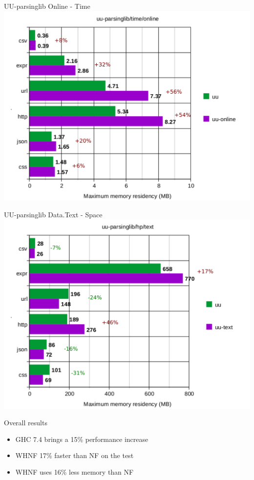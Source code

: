 \documentclass{beamer}
\begin{document}
\begin{frame}{UU-parsinglib Online - Time}
\includegraphics[scale=0.5]{presentation/uu-parsinglib-time-online_.pdf}
\end{frame}

\begin{frame}{UU-parsinglib Data.Text - Space}
\includegraphics[scale=0.5]{presentation/uu-parsinglib-hp-text_.pdf}
\end{frame}


\begin{frame}{Overall results}
\begin{itemize}
\item GHC 7.4 brings a 15\%  performance increase
\item WHNF 17\% faster than NF on the test
\item WHNF uses 16\% less memory than NF
\end{itemize}
\end{frame}
\end{document}

